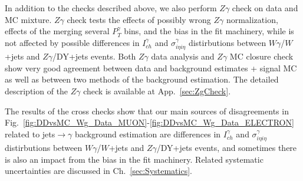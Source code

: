 In addition to the checks described above, we also perform $Z\gamma$ check on data and MC mixture. $Z\gamma$ check tests the effects of possibly wrong $Z\gamma$ normalization, effects of the merging several $P_T^{\gamma}$ bins, and the bias in the fit machinery, while is not affected by possible differences in $I_{ch}^{\gamma}$ and $\sigma_{i\eta i\eta}^{\gamma}$ distirbutions between $W\gamma$/$W$+jets and $Z\gamma$/DY+jets events. Both $Z\gamma$ data analysis and $Z\gamma$ MC closure check show very good agreement between data and background estimates + signal MC as well as between two methods of the background estimation. The detailed description of the $Z\gamma$ check is available at App.~\ref{sec:ZgCheck}. 

The results of the cross checks show that our main sources of disagreements in Fig.~\ref{fig:DDvsMC_Wg_Data_MUON}-\ref{fig:DDvsMC_Wg_Data_ELECTRON} related to jets$\rightarrow\gamma$ background estimation are differences in $I_{ch}^{\gamma}$ and $\sigma_{i\eta i\eta}^{\gamma}$ distirbutions between $W\gamma$/$W$+jets and $Z\gamma$/DY+jets events, and sometimes there is also an impact from the bias in the fit machinery. Related systematic uncertainties are discussed in Ch.~\ref{sec:Systematics}.

